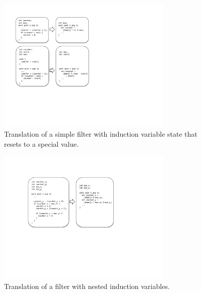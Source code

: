 \begin{figure}[t]
\includegraphics[width=3.3in]{figures/transformation2.pdf}
\caption{Translation of a simple filter with induction variable state that resets to a special value. \protect\label{fig:transform-after-start}}
\end{figure}

\begin{figure}[t]
\includegraphics[width=3.3in]{figures/transformation3.pdf}
\caption{Translation of a filter with nested induction variables. \protect\label{fig:transform-after-twonested}}
\end{figure}


